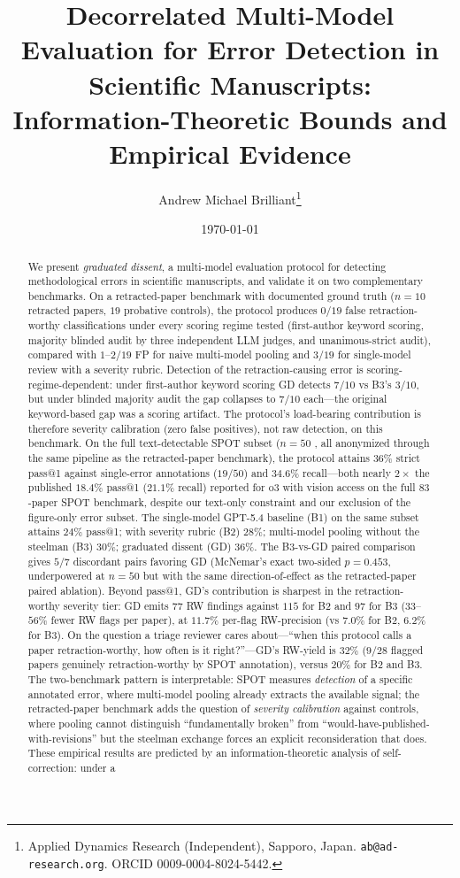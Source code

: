 \documentclass[11pt]{article}
\title{Decorrelated Multi-Model Evaluation for Error Detection in Scientific Manuscripts:\\[0.3em]
Information-Theoretic Bounds and Empirical Evidence}
\author{Andrew Michael Brilliant\thanks{Applied Dynamics Research (Independent), Sapporo, Japan. \texttt{ab@ad-research.org}. ORCID 0009-0004-8024-5442.}}
\date{\today}
\theoremstyle{definition}
\begin{document}
\maketitle

\begin{abstract}
We present \emph{graduated dissent}, a multi-model evaluation protocol for detecting methodological errors in scientific manuscripts, and validate it on two complementary benchmarks. On a retracted-paper benchmark with documented ground truth ($n = 10$ retracted papers, $19$ probative controls), the protocol produces $0/19$ false retraction-worthy classifications under every scoring regime tested (first-author keyword scoring, majority blinded audit by three independent LLM judges, and unanimous-strict audit), compared with $1$--$2/19$ FP for naive multi-model pooling and $3/19$ for single-model review with a severity rubric. Detection of the retraction-causing error is scoring-regime-dependent: under first-author keyword scoring GD detects $7/10$ vs B3's $3/10$, but under blinded majority audit the gap collapses to $7/10$ each---the original keyword-based gap was a scoring artifact. The protocol's load-bearing contribution is therefore severity calibration (zero false positives), not raw detection, on this benchmark. On the full text-detectable SPOT subset ($n = 50$ \citep{son2025spot}, all anonymized through the same pipeline as the retracted-paper benchmark), the protocol attains $36\%$ strict pass@1 against single-error annotations ($19/50$) and $34.6\%$ recall---both nearly $2\times$ the published $18.4\%$ pass@1 ($21.1\%$ recall) reported for o3 with vision access on the full $83$-paper SPOT benchmark, despite our text-only constraint and our exclusion of the figure-only error subset. The single-model GPT-5.4 baseline (B1) on the same subset attains $24\%$ pass@1; with severity rubric (B2) $28\%$; multi-model pooling without the steelman (B3) $30\%$; graduated dissent (GD) $36\%$. The B3-vs-GD paired comparison gives $5/7$ discordant pairs favoring GD (McNemar's exact two-sided $p = 0.453$, underpowered at $n=50$ but with the same direction-of-effect as the retracted-paper paired ablation). Beyond pass@1, GD's contribution is sharpest in the retraction-worthy severity tier: GD emits $77$ RW findings against $115$ for B2 and $97$ for B3 (33--$56\%$ fewer RW flags per paper), at $11.7\%$ per-flag RW-precision (vs $7.0\%$ for B2, $6.2\%$ for B3). On the question a triage reviewer cares about---``when this protocol calls a paper retraction-worthy, how often is it right?''---GD's RW-yield is $32\%$ ($9/28$ flagged papers genuinely retraction-worthy by SPOT annotation), versus $20\%$ for B2 and B3. The two-benchmark pattern is interpretable: SPOT measures \emph{detection} of a specific annotated error, where multi-model pooling already extracts the available signal; the retracted-paper benchmark adds the question of \emph{severity calibration} against controls, where pooling cannot distinguish ``fundamentally broken'' from ``would-have-published-with-revisions'' but the steelman exchange forces an explicit reconsideration that does. These empirical results are predicted by an information-theoretic analysis of self-correction: under a 
\end{abstract}
\end{document}
